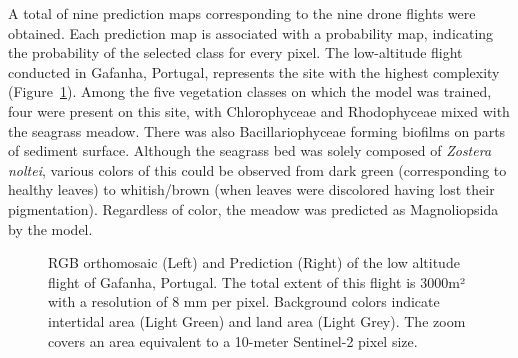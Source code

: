 \documentclass[
  number]{elsarticle}
\begin{document}
A total of nine prediction maps corresponding to the nine drone flights
were obtained. Each prediction map is associated with a probability map,
indicating the probability of the selected class for every pixel. The
low-altitude flight conducted in Gafanha, Portugal, represents the site
with the highest complexity (Figure~\ref{fig-GafLow}). Among the five
vegetation classes on which the model was trained, four were present on
this site, with Chlorophyceae and Rhodophyceae mixed with the seagrass
meadow. There was also Bacillariophyceae forming biofilms on parts of
sediment surface. Although the seagrass bed was solely composed of
\emph{Zostera noltei}, various colors of this could be observed from
dark green (corresponding to healthy leaves) to whitish/brown (when
leaves were discolored having lost their pigmentation). Regardless of
color, the meadow was predicted as Magnoliopsida by the model.

\label{cell-fig-GafLow}
\begin{figure}[H]


\caption{\label{fig-GafLow}RGB orthomosaic (Left) and Prediction (Right)
of the low altitude flight of Gafanha, Portugal. The total extent of
this flight is 3000m² with a resolution of 8 mm per pixel. Background
colors indicate intertidal area (Light Green) and land area (Light
Grey). The zoom covers an area equivalent to a 10-meter Sentinel-2 pixel
size.}

\end{figure}%
\end{document}
